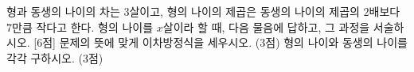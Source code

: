 형과 동생의 나이의 차는 $3$살이고, 형의 나이의 제곱은 동생의 나이의 제곱의 $2$배보다 $7$만큼 작다고 한다. 형의 나이를 $x$살이라 할 때, 다음 물음에 답하고, 그 과정을 서술하시오. \mbox{[6점]}
 문제의 뜻에 맞게 이차방정식을 세우시오. (3점)
 형의 나이와 동생의 나이를 각각 구하시오. (3점)
